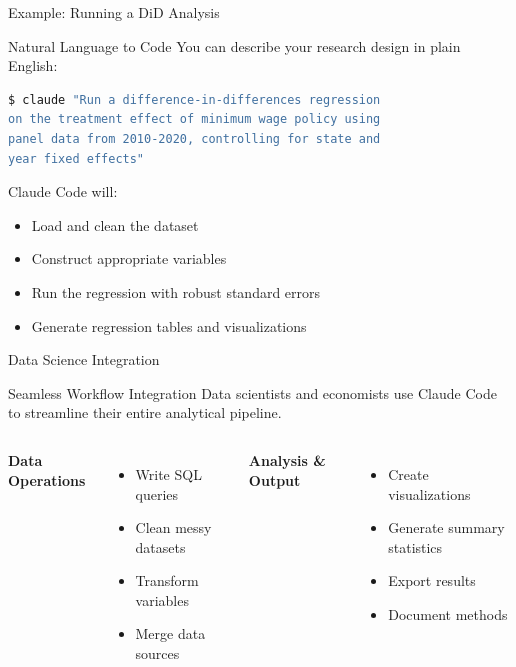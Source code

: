 \documentclass[9pt]{beamer}
\begin{document}
	\begin{frame}[fragile]{Example: Running a DiD Analysis}
		\begin{exampleblock}{Natural Language to Code}
			You can describe your research design in plain English:
		\end{exampleblock}
		
\begin{lstlisting}[language=bash]
$ claude "Run a difference-in-differences regression 
on the treatment effect of minimum wage policy using 
panel data from 2010-2020, controlling for state and 
year fixed effects"
\end{lstlisting}
		
		
		Claude Code will:
		\begin{itemize}
			\item Load and clean the dataset
			\item Construct appropriate variables
			\item Run the regression with robust standard errors
			\item Generate regression tables and visualizations
		\end{itemize}
	\end{frame}
	
	\begin{frame}{Data Science Integration}
		\begin{exampleblock}{Seamless Workflow Integration}
			Data scientists and economists use Claude Code to streamline their entire analytical pipeline.
		\end{exampleblock}
		
		\vspace{0.5cm}
		
		\begin{columns}[T,onlytextwidth]
			\textbf{Data Operations}
			\begin{itemize}
				\item Write SQL queries
				\item Clean messy datasets
				\item Transform variables
				\item Merge data sources
			\end{itemize}
			
			\textbf{Analysis \& Output}
			\begin{itemize}
				\item Create visualizations
				\item Generate summary statistics
				\item Export results
				\item Document methods
			\end{itemize}
		\end{columns}
	\end{frame}
	
\end{document}
